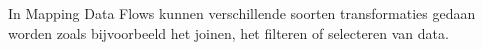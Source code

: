 In Mapping Data Flows kunnen verschillende soorten transformaties gedaan worden zoals bijvoorbeeld het joinen, het filteren of selecteren van data.


